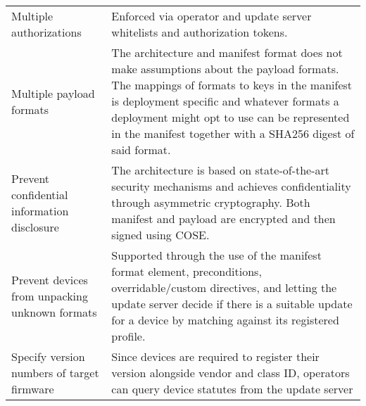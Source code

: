 \begin{longtable}[]{@{}ll@{}}
\begin{minipage}[t]{0.41\columnwidth}
Multiple authorizations\strut
\end{minipage} & \begin{minipage}[t]{0.53\columnwidth}\raggedright\strut
Enforced via operator and update server whitelists and authorization
tokens.\strut
\end{minipage}\tabularnewline
\begin{minipage}[t]{0.41\columnwidth}\raggedright\strut
Multiple payload formats\strut
\end{minipage} & \begin{minipage}[t]{0.53\columnwidth}\raggedright\strut
The architecture and manifest format does not make assumptions about the
payload formats. The mappings of formats to keys in the manifest is
deployment specific and whatever formats a deployment might opt to use
can be represented in the manifest together with a SHA256 digest of said
format.\strut
\end{minipage}\tabularnewline
\begin{minipage}[t]{0.41\columnwidth}\raggedright\strut
Prevent confidential information disclosure\strut
\end{minipage} & \begin{minipage}[t]{0.53\columnwidth}\raggedright\strut
The architecture is based on state-of-the-art security mechanisms and
achieves confidentiality through asymmetric cryptography. Both manifest
and payload are encrypted and then signed using COSE.\strut
\end{minipage}\tabularnewline
\begin{minipage}[t]{0.41\columnwidth}\raggedright\strut
Prevent devices from unpacking unknown formats\strut
\end{minipage} & \begin{minipage}[t]{0.53\columnwidth}\raggedright\strut
Supported through the use of the manifest format element, preconditions,
overridable/custom directives, and letting the update server decide if
there is a suitable update for a device by matching against its
registered profile.\strut
\end{minipage}\tabularnewline
\begin{minipage}[t]{0.41\columnwidth}\raggedright\strut
Specify version numbers of target firmware\strut
\end{minipage} & \begin{minipage}[t]{0.53\columnwidth}\raggedright\strut
Since devices are required to register their version alongside vendor
and class ID, operators can query device statutes from the update server

\end{minipage}
\end{longtable}
